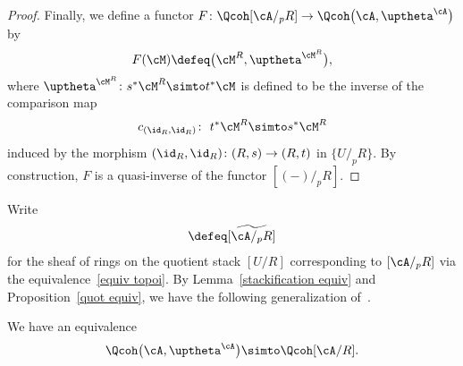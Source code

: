 \begin{prop}
\begin{proof}
Finally, we define a functor $F\colon \Qcoh[\cA/_pR]\to \Qcoh\big(\cA,\uptheta^{\cA}\big)$ by
\begin{gather*}
F(\cM)\defeq\big(\cM^R, \uptheta^{\cM^R}\big),
\end{gather*}
where $\uptheta^{\cM^R}\colon s^*\cM^R\simto t^*\cM$ is defined to be the inverse of the comparison map
\begin{gather*}
c_{(\id_R,\id_R)}\colon\ t^*\cM^R\simto s^*\cM^R
\end{gather*}
induced by the morphism $(\id_R,\id_R)\colon (R,s)\to (R,t)$ in $\{U/_pR\}$. By construction, $F$ is a quasi-inverse of the functor $[(-)/_pR]$.
\end{proof}
\end{prop}

Write
\begin{gather*}
[\cA/R]\defeq\widetilde{[\cA/_pR]}
\end{gather*}
for the sheaf of rings on the quotient stack $[U/R]$ corresponding to $[\cA/_pR]$ via the equivalence~\eqref{equiv topoi}. By Lemma~\ref{stackification equiv} and Proposition~\ref{quot equiv}, we have the following
 generalization of~\cite[Proposition~13.1; 06WT]{stacks}.

\begin{prop}\label{main app}
We have an equivalence
\begin{gather*}
\Qcoh\big(\cA,\uptheta^{\cA}\big)\simto \Qcoh[\cA/R].
\end{gather*}
\end{prop}

